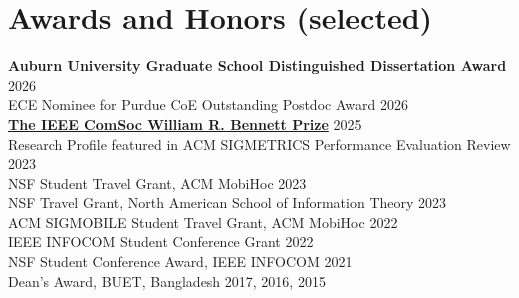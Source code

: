\documentclass[letterpaper,11pt]{article}
\begin{document}




\section*{Awards and Honors (selected)}
{\bf Auburn University Graduate School Distinguished Dissertation Award} \hfill 2026 \\
ECE Nominee for Purdue CoE Outstanding Postdoc Award \hfill 2026 \\
\href{https://www.comsoc.org/about/awards/paper-awards/ieee-communications-society-william-r-bennett-prize}{\bf The IEEE ComSoc William R. Bennett Prize} \hfill 2025 \\
Research Profile featured in ACM SIGMETRICS Performance Evaluation Review \hfill 2023 \\
NSF Student Travel Grant, ACM MobiHoc \hfill 2023 \\
NSF Travel Grant, North American School of Information Theory \hfill 2023 \\
ACM SIGMOBILE Student Travel Grant, ACM MobiHoc \hfill 2022 \\
IEEE INFOCOM Student Conference Grant \hfill 2022 \\
NSF Student Conference Award, IEEE INFOCOM \hfill 2021 \\
Dean's Award, BUET, Bangladesh \hfill 2017, 2016, 2015 \\
\end{document}
